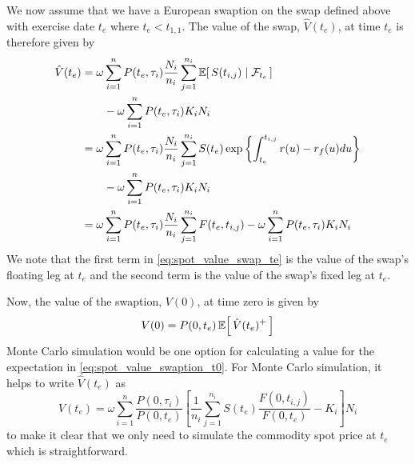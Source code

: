We now assume that we have a European swaption on the swap defined above with exercise date $t_e$ where $t_e < t_{1,1}$. The value of the swap, $\hat{V}(t_e)$, at time $t_e$ is therefore given by
\begin{equation}
\label{eq:spot_value_swap_te}
\begin{split}
\hat{V}(t_e) &= \omega \sum_{i=1}^{n} P(t_e, \tau_i) \frac{N_i}{n_i} \sum_{j=1}^{n_i} \CEx{S(t_{i,j})}{\mathcal{F}_{t_e}} \\
             &\qquad - \omega \sum_{i=1}^{n} P(t_e, \tau_i) K_i N_i \\
             &= \omega \sum_{i=1}^{n} P(t_e, \tau_i) \frac{N_i}{n_i} \sum_{j=1}^{n_i} S(t_e) \exp \left\{ \int_{t_e}^{t_{i,j}} r(u) - r_f(u) du \right\} \\
             &\qquad - \omega \sum_{i=1}^{n} P(t_e, \tau_i) K_i N_i \\
             &= \omega \sum_{i=1}^{n} P(t_e, \tau_i) \frac{N_i}{n_i} \sum_{j=1}^{n_i} F(t_e, t_{i,j}) - \omega \sum_{i=1}^{n} P(t_e, \tau_i) K_i N_i
\end{split}
\end{equation}
We note that the first term in \eqref{eq:spot_value_swap_te} is the value of the swap's floating leg at $t_e$ and the second term is the value of the swap's fixed leg at $t_e$.

Now, the value of the swaption, $V(0)$, at time zero is given by
\begin{equation}
\label{eq:spot_value_swaption_t0}
V(0) = P(0, t_e) \Ex{\hat{V}(t_e)^{+}}
\end{equation}
Monte Carlo simulation would be one option for calculating a value for the expectation in \eqref{eq:spot_value_swaption_t0}. For Monte Carlo simulation, it helps to write $\hat{V}(t_e)$ as
\begin{equation}
\label{eq:spot_value_swap_te_mc}
\hat{V}(t_e) = \omega \sum_{i=1}^{n} \frac{P(0, \tau_i)}{P(0, t_e)} \left[ \frac{1}{n_i} \sum_{j=1}^{n_i} S(t_e) \frac{F(0, t_{i,j})}{F(0, t_e)} - K_i \right] N_i
\end{equation}
to make it clear that we only need to simulate the commodity spot price at $t_e$ which is straightforward.

